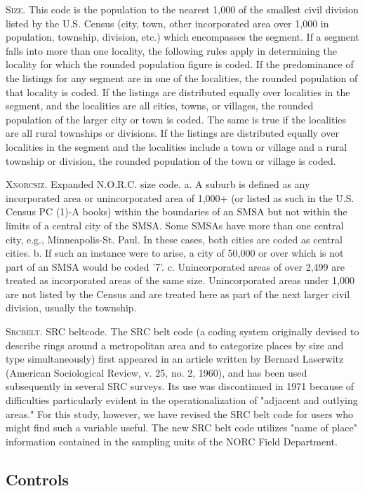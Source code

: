 \documentclass[10pt, letterpaper]{article}
\begin{document}
\begin{spacing}{1.4}
\textsc{Size}. This code is the population to the nearest 1,000 of the smallest civil
division listed by the U.S. Census (city, town, other incorporated
area over 1,000 in population, township, division, etc.) which
encompasses the segment. If a segment falls into more than one
locality, the following rules apply in determining the locality for
which the rounded population figure is coded.
If the predominance of the listings for any segment are in one of the
localities, the rounded population of that locality is coded.
If the listings are distributed equally over localities in the
segment, and the localities are all cities, towns, or villages, the
rounded population of the larger city or town is coded. The same is
true if the localities are all rural townships or divisions.
If the listings are distributed equally over localities in the segment
and the localities include a town or village and a rural township or
division, the rounded population of the town or village is coded.

\textsc{Xnorcsiz}. Expanded N.O.R.C. size code. 
a. A suburb is defined as any incorporated area or unincorporated area
of 1,000+ (or listed as such in the U.S. Census PC (1)-A books) within
the boundaries of an SMSA but not within the limits of a central city
of the SMSA. Some SMSAs have more than one central city, e.g.,
Minneapolis-St. Paul. In these cases, both cities are coded as central
cities.
b. If such an instance were to arise, a city of 50,000 or over which is
not part of an SMSA would be coded '7'.
c. Unincorporated areas of over 2,499 are treated as incorporated areas
of the same size. Unincorporated areas under 1,000 are not listed by
the Census and are treated here as part of the next larger civil
division, usually the township.

\textsc{Srcbelt}. SRC beltcode. The SRC belt code (a coding system originally devised to describe
rings around a metropolitan area and to categorize places by size
and type simultaneously) first appeared in an article written by
Bernard Laserwitz (American Sociological Review, v. 25, no. 2, 1960),
and has been used subsequently in several SRC surveys.
Its use was discontinued in 1971 because of difficulties particularly
evident in the operationalization of "adjacent and outlying areas."
For this study, however, we have revised the SRC belt code for users
who might find such a variable useful. The new SRC belt code utilizes
"name of place" information contained in the sampling units
of the NORC Field Department.


\subsection*{Controls}


\end{spacing}
\end{document}
